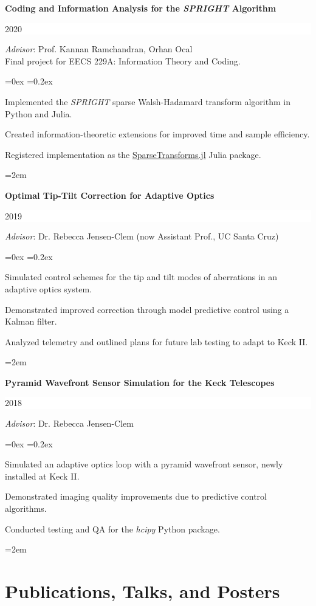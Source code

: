 \documentclass[paper=a4,fontsize=12pt]{scrartcl}
\newcommand{\cvlist}{%

    \rightmargin=0in
    \leftmargin=0.15in
    \topsep=0ex
    \partopsep=0pt
    \itemsep=0.2ex 
    \parsep=0pt
    \itemindent=0.0\leftmargin
    \listparindent=3.0\leftmargin
    \settowidth{\labelsep}{~}
    \leftskip=-10.1in
    \parindent=-0.1in
}
\newcommand{\NewPart}[1]{\section*{{#1}}}
\newcommand{\EducationEntry}[4]{
		\noindent \textbf{#1} \hfill      %
		\colorbox{White}{%
			\parbox{5cm}{%
			\hfill\color{Black}#2}} \par  %
		\noindent #3 \par        %
		\noindent\hangindent=2em\hangafter=0 \small #4 %
		\normalsize \par}
\begin{document}
\EducationEntry{Coding and Information Analysis for the \textit{SPRIGHT} Algorithm}{2020}{
\textit{Advisor}: Prof. Kannan Ramchandran, Orhan Ocal\\
Final project for EECS 229A: Information Theory and Coding.
\begin{list}{\textbullet}{\cvlist}
    \item Implemented the \textit{SPRIGHT} sparse Walsh-Hadamard transform algorithm in Python and Julia.
    \item Created information-theoretic extensions for improved time and sample efficiency.
    \item Registered implementation as the {\color{blue}\href{github.com/aditya-sengupta/SparseTransforms.jl}{SparseTransforms.jl}} Julia package.
\end{list}
}
\hfill

\EducationEntry{Optimal Tip-Tilt Correction for Adaptive Optics}{2019}{
\textit{Advisor}: Dr. Rebecca Jensen-Clem (now Assistant Prof., UC Santa Cruz)
\begin{list}{\textbullet}{\cvlist}
\setlength\itemsep{0pt}
\item Simulated control schemes for the tip and tilt modes of aberrations in an adaptive optics system. 
\item Demonstrated improved correction through model predictive control using a Kalman filter.
\item Analyzed telemetry and outlined plans for future lab testing to adapt to Keck II.
\end{list}
}
\hfill

\EducationEntry{Pyramid Wavefront Sensor Simulation for the Keck Telescopes}{2018}{
\textit{Advisor}: Dr. Rebecca Jensen-Clem
\begin{list}{\textbullet}{\cvlist}
\item Simulated an adaptive optics loop with a pyramid wavefront sensor, newly installed at Keck II. 
\item Demonstrated imaging quality improvements due to predictive control algorithms. 
\item Conducted testing and QA for the \textit{hcipy} Python package.
\end{list}
}
\newpage
\NewPart{Publications, Talks, and Posters}
\end{document}
